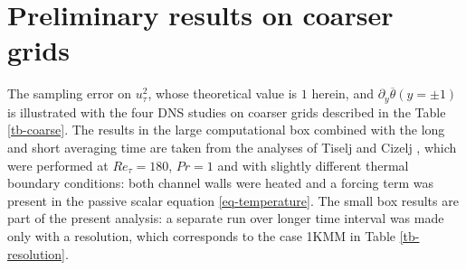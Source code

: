 \documentclass[review]{elsarticle}
\begin{document}
\section{Preliminary results on coarser grids}

The sampling error on $u_\tau^2$, whose theoretical value is $1$ herein, and $\partial_y \overline{\theta} \left( y = \pm 1 \right)$ is illustrated with the four DNS studies on coarser grids described in the Table \ref{tb-coarse}. The results in the large computational box combined with the long and short averaging time are taken from the analyses of Tiselj and Cizelj \cite{tiselj2012dns}, which were performed at $Re_\tau=180$, $Pr=1$ and with slightly different thermal boundary conditions: both channel walls were heated and a forcing term was present in the passive scalar equation \eqref{eq-temperature}. The small box results are part of the present analysis: a separate run over longer time interval was made only with a resolution, which corresponds to the case 1KMM in Table \ref{tb-resolution}.
\end{document}
